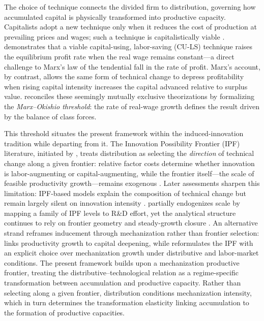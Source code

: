 The choice of technique connects the divided firm to
distribution, governing how accumulated capital is physically
transformed into productive capacity. Capitalists adopt a new
technique only when it reduces the cost of production at
prevailing prices and wages; such a technique is capitalistically
viable \citep{Okishio1961}. \citet{Okishio1961} demonstrates
that a viable capital-using, labor-saving (CU-LS) technique
raises the equilibrium profit rate when the real wage remains
constant---a direct challenge to Marx's law of the tendential
fall in the rate of profit. Marx's account, by contrast, allows
the same form of technical change to depress profitability when
rising capital intensity increases the capital advanced relative
to surplus value. \citet{Basu2022} reconciles these seemingly mutually exclusive 
theorizations by formalizing the \textit{Marx--Okishio threshold}: 
the rate of real-wage growth defines the result driven by
the balance of class forces. 

This threshold situates the present framework within the
induced-innovation tradition while departing from it. The
Innovation Possibility Frontier (IPF) literature, initiated by
\citet{Kennedy1964}, treats distribution as selecting the
\textit{direction} of technical change along a given frontier:
relative factor costs determine whether innovation is
labor-augmenting or capital-augmenting, while the frontier
itself---the scale of feasible productivity growth---remains
exogenous \citep{Julius2005, Tavani2012}. Later assessments
sharpen this limitation: IPF-based models explain the
composition of technical change but remain largely silent on
innovation intensity \citep{TavaniZamparelli2018}.
\citet{Zamparelli2024a} partially endogenizes scale by mapping
a family of IPF levels to R\&D effort, yet the analytical
structure continues to rely on frontier geometry and
steady-growth closure \citep{Zamparelli2024b}. An alternative
strand reframes inducement through mechanization rather than
frontier selection: \citet{Kaldor1957} links productivity
growth to capital deepening, while
\citet{CajasGuajirro2024} reformulates the IPF with an explicit
choice over mechanization growth under distributive and
labor-market conditions. The present framework builds upon a 
mechanization productive frontier,  treating the distributive--technological 
relation as a regime-specific transformation between accumulation and
productive capacity. Rather than selecting along a given
frontier, distribution conditions mechanization intensity,
which in turn determines the transformation elasticity linking
accumulation to the formation of productive capacities. 

